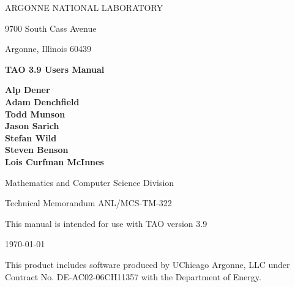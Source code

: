 
\vspace{1.75in}

\begin{center}

ARGONNE NATIONAL LABORATORY

9700 South Cass Avenue

Argonne, Illinois  60439

\vspace{1.5in}

{\Large
{\bf 
TAO 3.9 Users Manual
}
}

\vspace{.5in}

{\bf Alp Dener \\ Adam Denchfield \\ Todd Munson \\ Jason Sarich \\ Stefan Wild \\ Steven Benson \\ Lois Curfman McInnes}

\vspace{.5in}

Mathematics and Computer Science Division

\vspace{.25in}

Technical Memorandum ANL/MCS-TM-322

\vspace{.25in}

This manual is intended for use with TAO version 3.9

\vspace{1.0in}

\today
\end{center}

\vspace{0.75in}

\par\noindent
This product includes software produced by UChicago Argonne, LLC under 
Contract No. DE-AC02-06CH11357 with the Department of Energy.
